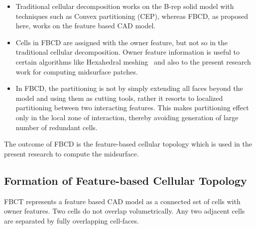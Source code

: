 \begin{itemize}[noitemsep,topsep=2pt,parsep=2pt,partopsep=2pt]
\item Traditional cellular decomposition works on the B-rep solid model with techniques such as Convex partitioning (CEP), whereas FBCD, as proposed here, works on the feature based CAD model.
\item Cells in FBCD are assigned with the owner feature, but not so in the traditional cellular decomposition. Owner feature information is useful to certain algorithms like Hexahedral meshing~\cite{Wu2014} and also to the present research work for computing midsurface patches. 
\item In FBCD, the partitioning is not by simply extending all faces beyond the model and using them as cutting tools, rather it resorts to localized partitioning between two interacting features. This makes partitioning effect only in the local zone of interaction, thereby avoiding generation of large number of redundant cells.
\end{itemize}
 
The outcome of FBCD is the feature-based cellular topology which is used in the present research to compute the midsurface. 

\subsection{Formation of Feature-based Cellular Topology}\label{sec:midsurfcelljoin:fbct}

FBCT represents a feature based CAD model as a connected set of cells with owner features. Two cells do not overlap volumetrically. Any two adjacent cells are separated by fully overlapping cell-faces.

